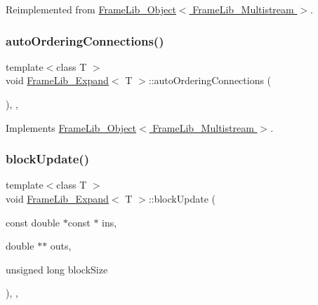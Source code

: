Reimplemented from \hyperlink{class_frame_lib___object_af618fcdec82b457911147c7c293bedd7}{Frame\+Lib\+\_\+\+Object$<$ Frame\+Lib\+\_\+\+Multistream $>$}.

\mbox{\label{class_frame_lib___expand_affdd2a6ec7ae518770f1fdfea1ce8768}} 
\subsubsection{\texorpdfstring{auto\+Ordering\+Connections()}{autoOrderingConnections()}}
{\footnotesize\ttfamily template$<$class T $>$ \\
void \hyperlink{class_frame_lib___expand}{Frame\+Lib\+\_\+\+Expand}$<$ T $>$\+::auto\+Ordering\+Connections (\begin{DoxyParamCaption}{ }\end{DoxyParamCaption})\hspace{0.3cm}{\ttfamily [inline]}, {\ttfamily [override]}, {\ttfamily [virtual]}}



Implements \hyperlink{class_frame_lib___object_afa5bb93302a641c23b5eac7ab0dfe516}{Frame\+Lib\+\_\+\+Object$<$ Frame\+Lib\+\_\+\+Multistream $>$}.

\mbox{\label{class_frame_lib___expand_a5601bb681542a7da33a688af0c74c163}} 
\subsubsection{\texorpdfstring{block\+Update()}{blockUpdate()}}
{\footnotesize\ttfamily template$<$class T $>$ \\
void \hyperlink{class_frame_lib___expand}{Frame\+Lib\+\_\+\+Expand}$<$ T $>$\+::block\+Update (\begin{DoxyParamCaption}\item[{const double $\ast$const $\ast$}]{ins,  }\item[{double $\ast$$\ast$}]{outs,  }\item[{unsigned long}]{block\+Size }\end{DoxyParamCaption})\hspace{0.3cm}{\ttfamily [inline]}, {\ttfamily [override]}, {\ttfamily [virtual]}}



